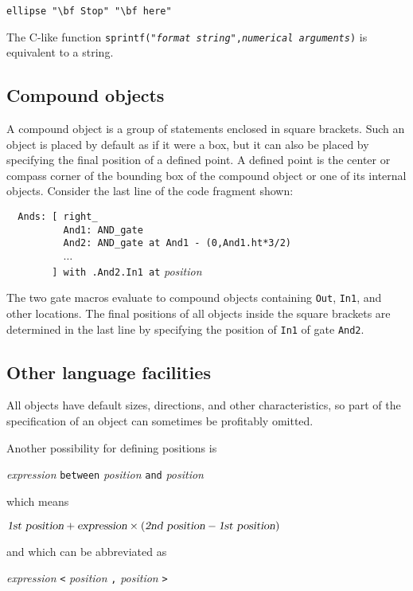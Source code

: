 \verb|ellipse "\bf Stop" "\bf here"|

\noindent
The C-like \pic function
 {\tt sprintf("{\sl format string}",{\sl numerical arguments})}
is equivalent to a string.

\subsection{Compound objects\label{Compoundobjects:}}
A compound object is a group of statements enclosed in square
brackets.  Such an object is placed by default as if it were a box, but
it can also be placed by specifying the final position of a defined point.
A defined point is the center or compass corner of the bounding box
of the compound object or one of its internal objects.
Consider the last line of the code fragment shown:

\noindent%
\verb|  Ands: [ right_|\\
\verb|          And1: AND_gate|\\
\verb|          And2: AND_gate at And1 - (0,And1.ht*3/2)|\\
\verb|          |$\ldots$\\
\verb|        ] with .And2.In1 at| {\sl position} %

The two gate macros evaluate to compound objects containing {\tt Out},
{\tt In1}, and other locations.  The final positions of all objects
inside the square brackets are determined in the last line by
specifying the position of {\tt In1} of gate {\tt And2}.

\subsection{Other language facilities\label{Otherlanguage:}}

All objects have default sizes, directions, and other characteristics,
so part of the specification of an object can sometimes be profitably
omitted.

Another possibility for defining positions is 

{\sl expression} {\tt between} {\sl position}
 {\tt and} {\sl position}

\noindent%
which means 

$\hbox{\sl 1st position} + \hbox{\sl expression} \times 
  (\hbox{\sl 2nd position} - \hbox{\sl 1st position})$

\noindent and which can be abbreviated as

{\sl expression} {\tt <} {\sl position} {\tt ,} {\sl position} {\tt >}

